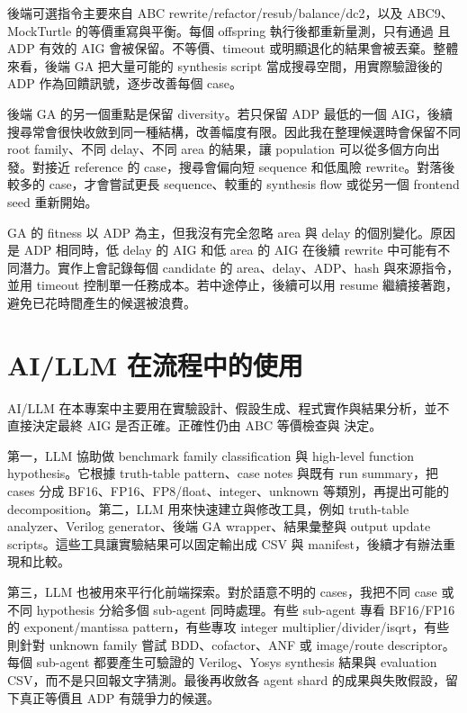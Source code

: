 \documentclass[UTF8,fontset=none,10pt,a4paper]{ctexart}
\newcommand{\code}[1]{\texttt{\detokenize{#1}}}
\begin{document}
後端可選指令主要來自 ABC rewrite/refactor/resub/balance/dc2，以及 ABC9、MockTurtle 的等價重寫與平衡。每個 offspring 執行後都重新量測，只有通過 \code{evaluate.py} 且 ADP 有效的 AIG 會被保留。不等價、timeout 或明顯退化的結果會被丟棄。整體來看，後端 GA 把大量可能的 synthesis script 當成搜尋空間，用實際驗證後的 ADP 作為回饋訊號，逐步改善每個 case。

後端 GA 的另一個重點是保留 diversity。若只保留 ADP 最低的一個 AIG，後續搜尋常會很快收斂到同一種結構，改善幅度有限。因此我在整理候選時會保留不同 root family、不同 delay、不同 area 的結果，讓 population 可以從多個方向出發。對接近 reference 的 case，搜尋會偏向短 sequence 和低風險 rewrite。對落後較多的 case，才會嘗試更長 sequence、較重的 synthesis flow 或從另一個 frontend seed 重新開始。

GA 的 fitness 以 ADP 為主，但我沒有完全忽略 area 與 delay 的個別變化。原因是 ADP 相同時，低 delay 的 AIG 和低 area 的 AIG 在後續 rewrite 中可能有不同潛力。實作上會記錄每個 candidate 的 area、delay、ADP、hash 與來源指令，並用 timeout 控制單一任務成本。若中途停止，後續可以用 resume 繼續接著跑，避免已花時間產生的候選被浪費。

\section{AI/LLM 在流程中的使用}

AI/LLM 在本專案中主要用在實驗設計、假設生成、程式實作與結果分析，並不直接決定最終 AIG 是否正確。正確性仍由 ABC 等價檢查與 \code{evaluate.py} 決定。

第一，LLM 協助做 benchmark family classification 與 high-level function hypothesis。它根據 truth-table pattern、case notes 與既有 run summary，把 cases 分成 BF16、FP16、FP8/float、integer、unknown 等類別，再提出可能的 decomposition。第二，LLM 用來快速建立與修改工具，例如 truth-table analyzer、Verilog generator、後端 GA wrapper、結果彙整與 output update scripts。這些工具讓實驗結果可以固定輸出成 CSV 與 manifest，後續才有辦法重現和比較。

第三，LLM 也被用來平行化前端探索。對於語意不明的 cases，我把不同 case 或不同 hypothesis 分給多個 sub-agent 同時處理。有些 sub-agent 專看 BF16/FP16 的 exponent/mantissa pattern，有些專攻 integer multiplier/divider/isqrt，有些則針對 unknown family 嘗試 BDD、cofactor、ANF 或 image/route descriptor。每個 sub-agent 都要產生可驗證的 Verilog、Yosys synthesis 結果與 evaluation CSV，而不是只回報文字猜測。最後再收斂各 agent shard 的成果與失敗假設，留下真正等價且 ADP 有競爭力的候選。
\end{document}
